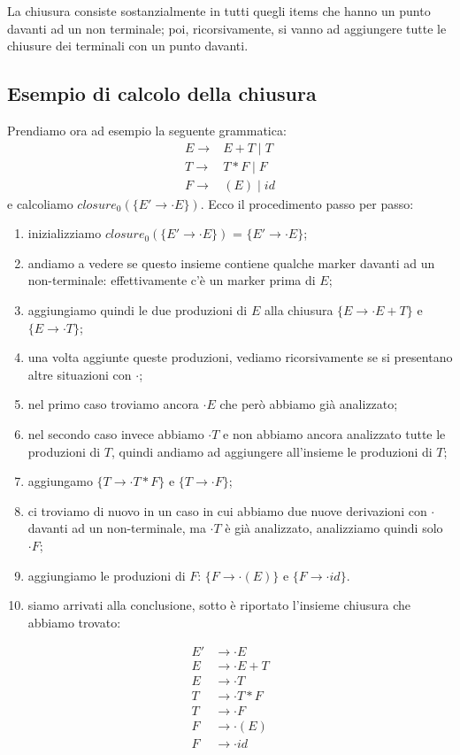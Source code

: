 \documentclass[class=book, crop=false, oneside, 12pt]{standalone}
\begin{document}
La chiusura consiste sostanzialmente in tutti quegli items che hanno un punto davanti ad un non terminale; poi, ricorsivamente, si vanno ad aggiungere tutte le chiusure dei terminali con un punto davanti.

\subsection{Esempio di calcolo della chiusura}
Prendiamo ora ad esempio la seguente grammatica:
\begin{align*}
    E \to& E+T \mid T\\
    T \to& T*F \mid F\\
    F \to& (E) \mid id
\end{align*}
e calcoliamo \(closure_0 (\{E' \to \cdot E\})\). Ecco il procedimento passo per passo:
\begin{enumerate}
    \item inizializziamo \(closure_0 (\{E' \to \cdot E\})\) = \(\{E' \to \cdot E\}\); 
    \item andiamo a vedere se questo insieme contiene qualche marker davanti ad un non-terminale: effettivamente c'è un marker prima di \(E\);
    \item aggiungiamo quindi le due produzioni di \(E\) alla chiusura \(\{E \to \cdot E+T\}\) e \(\{E \to \cdot T\}\);
    \item una volta aggiunte queste produzioni, vediamo ricorsivamente se si presentano altre situazioni con \(\cdot\);
    \item nel primo caso troviamo ancora \(\cdot E\) che però abbiamo già analizzato;
    \item nel secondo caso invece abbiamo \(\cdot T\) e non abbiamo ancora analizzato tutte le produzioni di \(T\), quindi andiamo ad aggiungere all'insieme le produzioni di \(T\);
    \item aggiungamo \(\{T \to \cdot T * F\}\) e \(\{T \to \cdot F\}\);
    \item ci troviamo di nuovo in un caso in cui abbiamo due nuove derivazioni con \(\cdot\) davanti
    ad un non-terminale, ma \(\cdot T\) è già analizzato, analizziamo quindi solo \(\cdot F\);
    \item aggiungiamo le produzioni di \(F\): \(\{F \to \cdot (E)\}\) e \(\{F \to \cdot id \}\).
    \item siamo arrivati alla conclusione, sotto è riportato l'insieme chiusura che abbiamo trovato:
\end{enumerate}
\begin{align*}
    E'&\to \cdot E \\
    E  &\to \cdot E+T \\
    E  &\to \cdot T \\
    T  &\to \cdot T * F \\
    T  &\to \cdot F \\
    F  &\to \cdot (E) \\
    F  &\to \cdot id
\end{align*}
\end{document}
